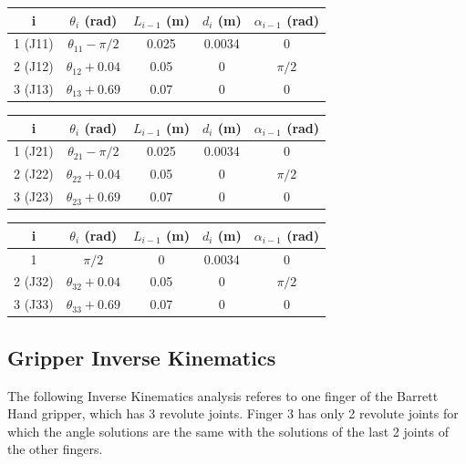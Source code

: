\begin{center}
\begin{tabular}{ |c|c|c|c|c| } 
\hline
i & $θ_i$ (rad) & $L_{i-1}$ (m) & $d_i$ (m) & $α_{i-1}$ (rad) \\
\hline
1 (J11) & $θ_{11} - π/2$ & 0.025 & 0.0034 & 0 \\
2 (J12) & $θ_{12} + 0.04$ & 0.05 & 0 & $π/2$ \\
3 (J13) & $θ_{13} + 0.69$ & 0.07 & 0 & 0 \\
\hline
\end{tabular}
\end{center}

\begin{center}
\begin{tabular}{ |c|c|c|c|c| } 
\hline
i & $θ_i$ (rad) & $L_{i-1}$ (m) & $d_i$ (m) & $α_{i-1}$ (rad) \\
\hline
1 (J21) & $θ_{21} - π/2$ & 0.025 & 0.0034 & 0 \\
2 (J22) & $θ_{22} + 0.04$ & 0.05 & 0 & $π/2$ \\
3 (J23) & $θ_{23} + 0.69$ & 0.07 & 0 & 0 \\
\hline
\end{tabular}
\end{center}

\begin{center}
\begin{tabular}{ |c|c|c|c|c| } 
\hline
i & $θ_i$ (rad) & $L_{i-1}$ (m) & $d_i$ (m) & $α_{i-1}$ (rad) \\
\hline
1 & $π/2$ & 0 & 0.0034 & 0 \\
2 (J32) & $θ_{32} + 0.04$ & 0.05 & 0 & $π/2$ \\
3 (J33) & $θ_{33} + 0.69$ & 0.07 & 0 & 0 \\
\hline
\end{tabular}
\end{center}


\subsection{Gripper Inverse Kinematics}

The following Inverse Kinematics analysis referes to one finger of the Barrett Hand gripper, which has 3 revolute joints. Finger 3 has only 2 
revolute joints for which the angle solutions are the same with the solutions of the last 2 joints of the other fingers. 


